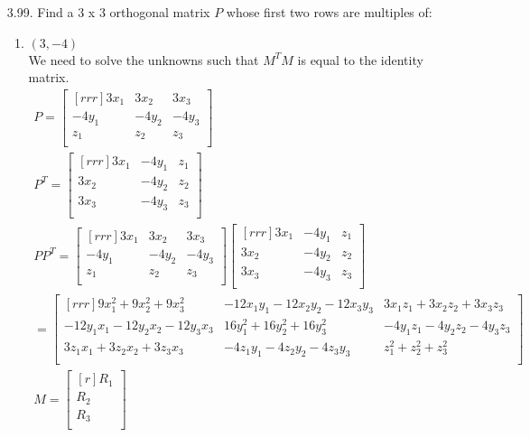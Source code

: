 \documentclass[12pt]{article}
\begin{document}
\begin{enumerate}
\pagebreak
\item [3.99.] Find a 3 x 3 orthogonal matrix $P$ whose first two rows are multiples of:
	\begin{enumerate}
	\item $(3, -4)$\\
	We need to solve the unknowns such that $M^TM$ is equal to the identity matrix.
	\begin{align*}
	P = \begin{bmatrix}[rrr]
	3x_1 & 3x_2 & 3x_3\\
	-4y_1 & -4y_2 & -4y_3\\
	z_1 & z_2 & z_3\\
	\end{bmatrix}\\
	P^T = \begin{bmatrix}[rrr]
	3x_1 & -4y_1 & z_1\\
	3x_2 & -4y_2 & z_2\\
	3x_3 & -4y_3 & z_3\\
	\end{bmatrix}\\	
	PP^T = \begin{bmatrix}[rrr]
	3x_1 & 3x_2 & 3x_3\\
	-4y_1 & -4y_2 & -4y_3\\
	z_1 & z_2 & z_3\\
	\end{bmatrix}
	\begin{bmatrix}[rrr]
	3x_1 & -4y_1 & z_1\\
	3x_2 & -4y_2 & z_2\\
	3x_3 & -4y_3 & z_3\\
	\end{bmatrix}\\
	= \begin{bmatrix}[rrr]
	9x_1^2+9x_2^2+9x_3^2 & -12x_1y_1-12x_2y_2-12x_3y_3 & 3x_1z_1+3x_2z_2+3x_3z_3\\
	-12y_1x_1-12y_2x_2-12y_3x_3 & 16y_1^2+16y_2^2+16y_3^2 & -4y_1z_1-4y_2z_2-4y_3z_3\\
	3z_1x_1+3z_2x_2+3z_3x_3 & -4z_1y_1-4z_2y_2-4z_3y_3 & z_1^2+z_2^2+z_3^2\\
	\end{bmatrix}\\
	M= \begin{bmatrix}[r] R_1\\ R_2\\ R_3\\ \end{bmatrix}\\

\end{align*}
\end{enumerate}
\end{enumerate}
\end{document}
